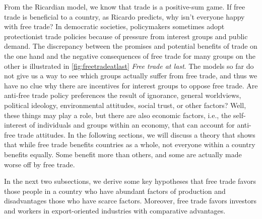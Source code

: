 	\pbn
	From the Ricardian model, we know that trade is a positive-sum game. 
	If free trade is beneficial to a country, as Ricardo predicts, why isn't everyone happy with free trade? 
	In democratic societies, policymakers sometimes adopt protectionist trade policies because of pressure from interest groups and public demand. 
	The discrepancy between the promises and potential benefits of trade on the one hand and the negative consequences of free trade for many groups on the other is illustrated in \autoref{fig:freetradeatlast} \textit{Free trade at last}. The models so far do not give us a way to see which groups actually suffer from free trade, and thus we have no clue  why there are incentives for interest groups to oppose free trade. 
	Are anti-free trade policy preferences the result of ignorance, general worldviews, political ideology, environmental attitudes, social trust, or other factors? Well, these things may play a role, but there are also economic factors, i.e., the self-interest of individuals and groups within an economy, that can account for anti-free trade attitudes.
	In the following sections, we will discuss a theory that shows that while free trade benefits countries as a whole, not everyone within a country benefits equally. Some benefit more than others, and some are actually made worse off by free trade. 
	
	In the next two subsections, we derive some key hypotheses that free trade favors those people in a country who have abundant factors of production and disadvantages those who have scarce factors. Moreover, free trade favors investors and workers in export-oriented industries with comparative advantages.
	
	\pbn
